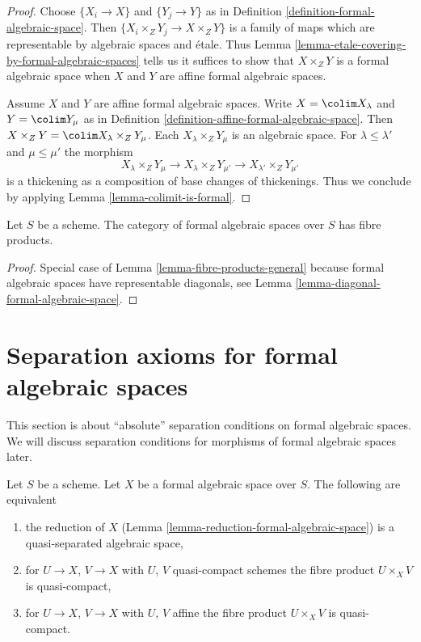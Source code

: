 \begin{proof}
Choose $\{X_i \to X\}$ and $\{Y_j \to Y\}$ as in
Definition \ref{definition-formal-algebraic-space}.
Then $\{X_i \times_Z Y_j \to X \times_Z Y\}$ is a family
of maps which are representable by algebraic spaces and \'etale.
Thus Lemma \ref{lemma-etale-covering-by-formal-algebraic-spaces}
tells us it suffices to show that $X \times_Z Y$ is a formal
algebraic space when $X$ and $Y$ are affine formal algebraic spaces.

\medskip\noindent
Assume $X$ and $Y$ are affine formal algebraic spaces.
Write $X = \colim X_\lambda$ and $Y = \colim Y_\mu$ as
in Definition \ref{definition-affine-formal-algebraic-space}.
Then $X \times_Z Y = \colim X_\lambda \times_Z Y_\mu$.
Each $X_\lambda \times_Z Y_\mu$ is an algebraic space.
For $\lambda \leq \lambda'$ and $\mu \leq \mu'$ the morphism
$$
X_\lambda \times_Z Y_\mu \to
X_\lambda \times_Z Y_{\mu'} \to
X_{\lambda'} \times_Z Y_{\mu'}
$$
is a thickening as a composition of base changes of thickenings.
Thus we conclude by applying Lemma \ref{lemma-colimit-is-formal}.
\end{proof}

\begin{lemma}
\label{lemma-fibre-products}
Let $S$ be a scheme. The category of formal algebraic spaces over $S$
has fibre products.
\end{lemma}

\begin{proof}
Special case of Lemma \ref{lemma-fibre-products-general}
because formal algebraic spaces have representable diagonals, see
Lemma \ref{lemma-diagonal-formal-algebraic-space}.
\end{proof}







\section{Separation axioms for formal algebraic spaces}
\label{section-separation}

\noindent
This section is about ``absolute'' separation conditions on formal algebraic
spaces. We will discuss separation conditions for morphisms of formal
algebraic spaces later.

\begin{lemma}
\label{lemma-characterize-quasi-separated}
Let $S$ be a scheme. Let $X$ be a formal algebraic space over $S$.
The following are equivalent
\begin{enumerate}
\item the reduction of $X$
(Lemma \ref{lemma-reduction-formal-algebraic-space}) is a
quasi-separated algebraic space,
\item for $U \to X$, $V \to X$ with $U$, $V$ quasi-compact schemes
the fibre product $U \times_X V$ is quasi-compact,
\item for $U \to X$, $V \to X$ with $U$, $V$ affine
the fibre product $U \times_X V$ is quasi-compact.
\end{enumerate}
\end{lemma}

